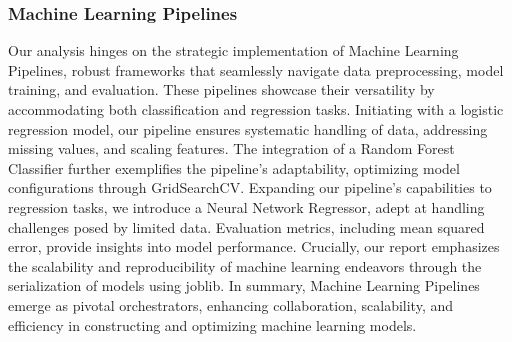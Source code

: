 \documentclass[letterpaper]{article}
\begin{document}
			\subsubsection*{Machine Learning Pipelines}
			Our analysis hinges on the strategic implementation of Machine Learning Pipelines, robust frameworks that seamlessly navigate data preprocessing, model training, and evaluation. These pipelines showcase their versatility by accommodating both classification and regression tasks. Initiating with a logistic regression model, our pipeline ensures systematic handling of data, addressing missing values, and scaling features. The integration of a Random Forest Classifier further exemplifies the pipeline's adaptability, optimizing model configurations through GridSearchCV. Expanding our pipeline's capabilities to regression tasks, we introduce a Neural Network Regressor, adept at handling challenges posed by limited data. Evaluation metrics, including mean squared error, provide insights into model performance. Crucially, our report emphasizes the scalability and reproducibility of machine learning endeavors through the serialization of models using joblib. In summary, Machine Learning Pipelines emerge as pivotal orchestrators, enhancing collaboration, scalability, and efficiency in constructing and optimizing machine learning models.
		\newpage
\end{document}
